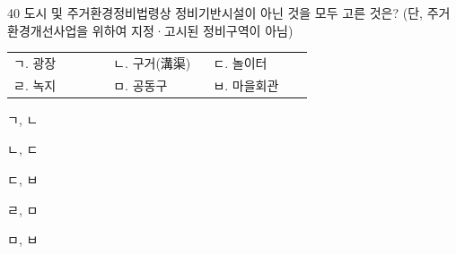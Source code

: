 \begin{question}{40}
도시 및 주거환경정비법령상 정비기반시설이 아닌 것을 모두 고른 것은? (단, 주거환경개선사업을 위하여 지정·고시된 정비구역이 아님)
\begin{framedtext}
{\centering\begin{tabular}{@{}p{0.3\linewidth}p{0.3\linewidth}p{0.3\linewidth}@{}}
ㄱ. 광장 & ㄴ. 구거(溝渠) & ㄷ. 놀이터 \\
ㄹ. 녹지 & ㅁ. 공동구 & ㅂ. 마을회관
\end{tabular}\par}
\end{framedtext}
\begin{choices}
  \item ㄱ, ㄴ
  \item ㄴ, ㄷ
  \item ㄷ, ㅂ
  \item ㄹ, ㅁ
  \item ㅁ, ㅂ
\end{choices}
\end{question}
